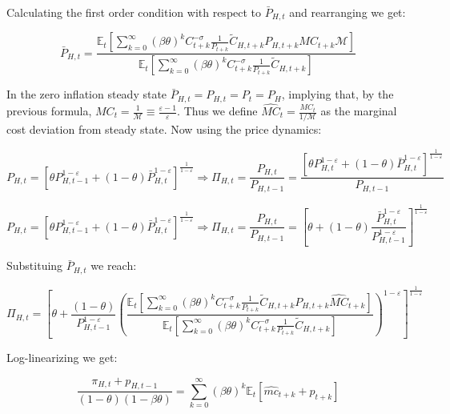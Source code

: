 \documentclass{article}
\newcommand{\Et}{\mathbb{E}_t}
\begin{document}
Calculating the first order condition with respect to $\bar P_{H,t}$ and rearranging we get:

\begin{equation}
    \bar P_{H,t} =  \frac{\Et\left[ \sum^\infty_{k=0} (\beta\theta)^k C_{t+k}^{-\sigma} \frac{1}{P_{t+k}}\tilde C_{H,t+k} P_{H,t+k} MC_{t+k} \mathcal M \right] }{\Et\left[ \sum^\infty_{k=0} (\beta\theta)^k C_{t+k}^{-\sigma} \frac{1}{P_{t+k}} \tilde C_{H,t+k}  \right]}
\end{equation}

In the zero inflation steady state $\bar P_{H,t} = P_{H,t} = P_{t} = P_H$, implying that, by the previous formula, $MC_{t}  = \frac{1}{\mathcal M} \equiv \frac{\varepsilon-1}{\varepsilon}$. Thus we define $\widehat{MC}_t = \frac{MC_t}{1/ \mathcal M}$ as the marginal cost deviation from steady state. Now using the price dynamics:

\begin{equation}
    P_{H,t} = [ \theta P_{H,t-1}^{1-\varepsilon} + (1-\theta) \bar P_{H,t}^{1-\varepsilon}]^\frac{1}{1-\varepsilon} \Rightarrow \Pi_{H,t} = \frac{P_{H,t}}{P_{H,t-1}} =  \frac{\left[ \theta P_{H,t}^{1-\varepsilon} + (1-\theta) \bar P_{H,t}^{1-\varepsilon}\right]^\frac{1}{1-\varepsilon}}{P_{H,t-1}} 
\end{equation}

\begin{equation}
    P_{H,t} = [ \theta P_{H,t-1}^{1-\varepsilon} + (1-\theta) \bar P_{H,t}^{1-\varepsilon}]^\frac{1}{1-\varepsilon} \Rightarrow \Pi_{H,t} = \frac{P_{H,t}}{P_{H,t-1}} =  \left[ \theta + (1-\theta) \frac{\bar P_{H,t}^{1-\varepsilon}}{P_{H,t-1}^{1-\varepsilon}} \right]^\frac{1}{1-\varepsilon} 
\end{equation}

Substituing $\bar P_{H,t}$ we reach:

\begin{equation}
    \Pi_{H,t} = \left[ \theta + \frac{(1-\theta)}{P_{H,t-1}^{1-\varepsilon}} \left(\frac{\Et\left[ \sum^\infty_{k=0} (\beta\theta)^k C_{t+k}^{-\sigma} \frac{1}{P_{t+k}}\tilde C_{H,t+k} P_{H,t+k} \widehat{MC}_{t+k}\right] }{\Et\left[ \sum^\infty_{k=0} (\beta\theta)^k C_{t+k}^{-\sigma} \frac{1}{P_{t+k}} \tilde C_{H,t+k}  \right]} \right)^{1-\varepsilon}\right]^\frac{1}{1-\varepsilon}
\end{equation}


Log-linearizing we get:

\begin{equation}
    \frac{\pi_{H,t} + p_{H,t-1}}{(1-\theta)(1-\beta \theta) } = \sum^\infty_{k=0} (\beta \theta)^k \Et[\hat{mc}_{t+k} + p_{t+k}] 
\end{equation}
\end{document}
